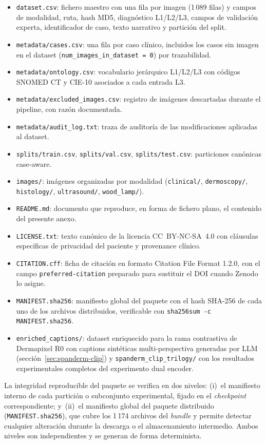 \begin{itemize}
\item \texttt{dataset.csv}: fichero maestro con una fila por imagen
(1\,089 filas) y campos de modalidad, ruta, hash MD5, diagnóstico
L1/L2/L3, campos de validación experta, identificador de caso,
texto narrativo y partición del split.
\item \texttt{metadata/cases.csv}: una fila por caso clínico,
incluidos los casos sin imagen en el dataset
(\texttt{num\_images\_in\_dataset = 0}) por trazabilidad.
\item \texttt{metadata/ontology.csv}: vocabulario jerárquico
L1/L2/L3 con códigos SNOMED CT y CIE-10 asociados a cada entrada
L3.
\item \texttt{metadata/excluded\_images.csv}: registro de imágenes
descartadas durante el pipeline, con razón documentada.
\item \texttt{metadata/audit\_log.txt}: traza de auditoría de las
modificaciones aplicadas al dataset.
\item \texttt{splits/train.csv}, \texttt{splits/val.csv},
\texttt{splits/test.csv}: particiones canónicas case-aware.
\item \texttt{images/}: imágenes organizadas por modalidad
(\texttt{clinical/}, \texttt{dermoscopy/}, \texttt{histology/},
\texttt{ultrasound/}, \texttt{wood\_lamp/}).
\item \texttt{README.md}: documento que reproduce, en forma de
fichero plano, el contenido del presente anexo.
\item \texttt{LICENSE.txt}: texto canónico de la licencia
CC~BY-NC-SA~4.0 con cláusulas específicas de privacidad del
paciente y provenance clínico.
\item \texttt{CITATION.cff}: ficha de citación en formato Citation
File Format 1.2.0, con el campo \texttt{preferred-citation}
preparado para sustituir el DOI cuando Zenodo lo asigne.
\item \texttt{MANIFEST.sha256}: manifiesto global del paquete con
el hash SHA-256 de cada uno de los archivos distribuidos,
verificable con \texttt{sha256sum -c MANIFEST.sha256}.
\item \texttt{enriched\_captions/}: dataset enriquecido para la
rama contrastiva de Dermapixel R0
con captions sintéticas multi-perspectiva generadas por LLM
(sección~\ref{sec:spanderm-clip}) y \texttt{spanderm\_clip\_trilogy/}
con los resultados experimentales completos del experimento dual
encoder.
\end{itemize}

La integridad reproducible del paquete se verifica en dos niveles:
(i)~el manifiesto interno de cada partición o subconjunto
experimental, fijado en el \emph{checkpoint} correspondiente;
y~(ii)~el manifiesto global del paquete distribuido
(\texttt{MANIFEST.sha256}), que cubre los 1\,174 archivos del
\emph{bundle} y permite detectar cualquier alteración durante la
descarga o el almacenamiento intermedio. Ambos niveles son
independientes y se generan de forma determinista.

